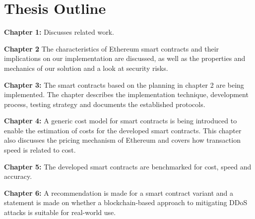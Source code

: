 \section{Thesis Outline}

\textbf{Chapter 1:} Discusses related work. 

\textbf{Chapter 2} The characteristics of Ethereum smart contracts and their implications on our implementation are discussed, as well as the properties and mechanics of our solution and a look at security risks.

\textbf{Chapter 3:} The smart contracts based on the planning in chapter 2 are being implemented. The chapter describes the implementation technique, development process, testing strategy and documents the established protocols.

\textbf{Chapter 4:} A generic cost model for smart contracts is being introduced to enable the estimation of costs for the developed smart contracts. This chapter also discusses the pricing mechanism of Ethereum and covers how transaction speed is related to cost.

\textbf{Chapter 5:} The developed smart contracts are benchmarked for cost, speed and accuracy. 

\textbf{Chapter 6:} A recommendation is made for a smart contract variant and a statement is made on whether a blockchain-based approach to mitigating DDoS attacks is suitable for real-world use.
